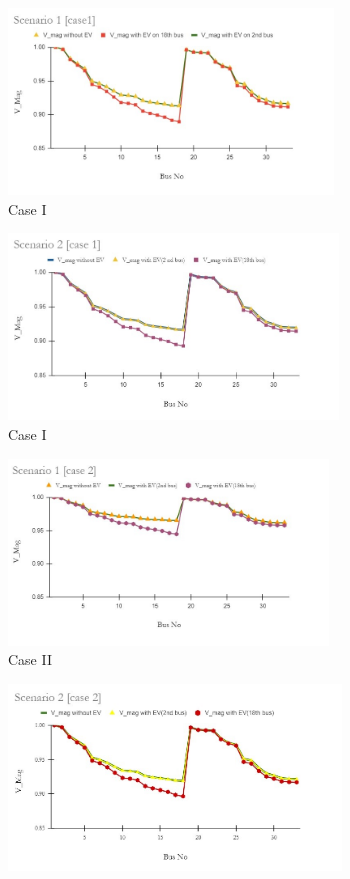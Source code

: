 	 \begin{figure}[!h]
		\begin{subfigure}{.5\textwidth}
			\centering
			\includegraphics[width=.97\linewidth,height= 4.95cm]{./Figures/sc1_case1}  
			\caption{Case I}
			\label{fig:LFa}
		\end{subfigure}
		\begin{subfigure}{.5\textwidth}
			\centering
			\includegraphics[width=.97\linewidth,height= 4.95cm]{./Figures/sc2_case1}  
			\caption{Case I}
			\label{fig:LF2a}
		\end{subfigure}
		\begin{subfigure}{.5\textwidth}
			\centering
			\includegraphics[width=.97\linewidth,height= 4.95cm]{./Figures/sc1_case2}
			\caption{Case II}
			\label{fig:LFb}
		\end{subfigure}
		\begin{subfigure}{.5\textwidth}
			\centering
			\includegraphics[width=.97\linewidth,height= 4.95cm]{./Figures/sc2_case2}

\end{subfigure}
\end{figure}
